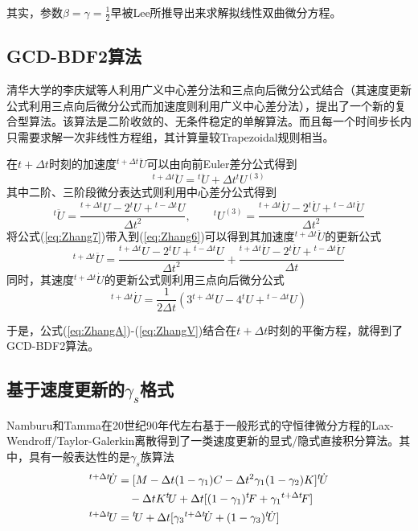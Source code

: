 其实，参数$\beta=\gamma=\frac{1}{2}$早被Lee所推导出来求解拟线性双曲微分方程\cite{Zienkiewicz1977a,Lees1966}。

\subsection{GCD-BDF2算法}
清华大学的李庆斌等人\cite{Zhang2015a}利用广义中心差分法和三点向后微分公式结合（其速度更新公式利用三点向后微分公式而加速度则利用广义中心差分法），提出了一个新的复合型算法。该算法是二阶收敛的、无条件稳定的单解算法。而且每一个时间步长内只需要求解一次非线性方程组，其计算量较Trapezoidal规则相当。

在$t+\Delta t$时刻的加速度${^{t+\Delta t}\!\ddot{U}}$可以由向前Euler差分公式得到
\begin{equation}
{^{t+\Delta t}\!\ddot{U}}={^t\!\ddot{U}}+\Delta t{^{t}\!U^{(3)}}\label{eq:Zhang6}
\end{equation}
其中二阶、三阶段微分表达式则利用中心差分公式得到
\begin{equation}
{^t\!\ddot{U}}=\frac{{^{t+\Delta t}\!U}-2{^t\!U}+{^{t-\Delta t}\!U}}{\Delta t^2},\qquad {^{t}\!U^{(3)}}=\frac{{^{t+\Delta t}\!\dot{U}}-2{^t\!\dot{U}}+{^{t-\Delta t}\!\dot{U}}}{\Delta t^2}\label{eq:Zhang7}
\end{equation}
将公式(\ref{eq:Zhang7})带入到(\ref{eq:Zhang6})可以得到其加速度${^{t+\Delta t}\!\ddot{U}}$的更新公式
\begin{equation}
{^{t+\Delta t}\!\ddot{U}}=\frac{{^{t+\Delta t}\!U}-2{^t\!U}+{^{t-\Delta t}\!U}}{\Delta t^2}+\frac{{^{t+\Delta t}\!\dot{U}}-2{^t\!\dot{U}}+{^{t-\Delta t}\!\dot{U}}}{\Delta t}\label{eq:ZhangA}
\end{equation}
同时，其速度${^{t+\Delta t}\!\dot{U}}$的更新公式则利用三点向后微分公式
\begin{equation}
{^{t+\Delta t}\!\dot{U}}=\frac{1}{2\Delta t}\left(3{^{t+\Delta t}\!U}-4{^t\!U}+{^{t-\Delta t}\!U}\right)\label{eq:ZhangV}
\end{equation}

于是，公式(\ref{eq:ZhangA})-(\ref{eq:ZhangV})结合在$t+\Delta t$时刻的平衡方程，就得到了GCD-BDF2算法。

\subsection{基于速度更新的$\gamma_s$格式}
Namburu和Tamma在20世纪90年代左右基于一般形式的守恒律微分方程的Lax-Wendroff/Taylor-Galerkin离散得到了一类速度更新的显式/隐式直接积分算法\cite{Tamma1988,Tamma1988c,Tamma1989,Tamma1990a,Tamma1990,Tamma1992,Namburu1992,}。其中，具有一般表达性的是$\gamma_s$族算法\cite{Namburu1992}
\begin{align}
[M+\Delta t\gamma_1C+\Delta t^2\gamma_1\gamma_2K]{^{t+\Delta t}\!\dot{U}}&=[M-\Delta t(1-\gamma_1)C-\Delta t^2\gamma_1(1-\gamma_2)K]{^t\!\dot{U}}\notag\\
&\quad -\Delta tK{^t\!U}+\Delta t[(1-\gamma_1){^t\!F}+\gamma_1{^{t+\Delta t}\!F}]\\
{^{t+\Delta t}\!U}&={^t\!U}+\Delta t[\gamma_3{^{t+\Delta t}\!\dot{U}}+(1-\gamma_3){^t\!\dot{U}}]\label{eq:TammaU}
\end{align}

